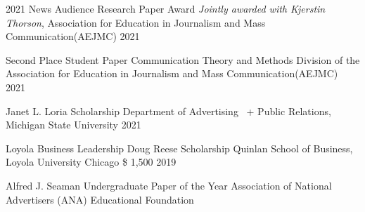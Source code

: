 
\begin{cvhonors}

    \cvhonor
    {2021 News Audience Research Paper Award} %
    { \textit{Jointly awarded with Kjerstin Thorson}, Association for Education in Journalism and Mass Communication(AEJMC) } %
    {} %
    {2021} %
    
    \cvhonor
    {Second Place Student Paper} %
    {Communication Theory and Methods Division of the Association for Education in Journalism and Mass Communication(AEJMC) } %
    {} %
    {2021} %
    
  \cvhonor
    {Janet L. Loria Scholarship} %
    {Department of Advertising \ +  Public Relations, Michigan State University} %
    {} %
    {2021} %
\end{cvhonors}

\begin{cvhonors}

  \cvhonor
    {Loyola Business Leadership Doug Reese Scholarship} %
   {Quinlan School of Business, Loyola University Chicago
} %
    {\$ 1,500} %
    {2019} %

\cvhonor
    {Alfred J. Seaman Undergraduate Paper of the Year} %
    {Association of National Advertisers (ANA) Educational Foundation
} %
    {} %
    {} %
\end{cvhonors}

